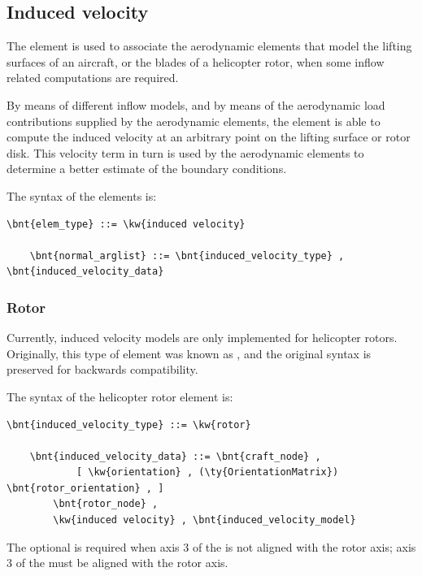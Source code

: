\subsection{Induced velocity}
\label{sec:EL:AERO:INDVEL}
The  element is used to associate the aerodynamic elements
that model the lifting surfaces of an aircraft,
or the blades of a helicopter rotor, when some inflow related computations 
are required.

By means of different inflow models, and by means
of the aerodynamic load contributions supplied by the aerodynamic elements,
the  element is able to compute the induced velocity
at an arbitrary point on the lifting surface or rotor disk.
This velocity term in turn is used by the aerodynamic elements to determine
a better estimate of the boundary conditions.

The syntax of the  elements is:
\begin{Verbatim}[commandchars=\\\{\}]
    \bnt{elem_type} ::= \kw{induced velocity}

    \bnt{normal_arglist} ::= \bnt{induced_velocity_type} , \bnt{induced_velocity_data}
\end{Verbatim}

\subsubsection{Rotor}
\label{sec:EL:AERO:INDVEL:ROTOR}
Currently, induced velocity models are only implemented
for helicopter rotors.
Originally, this type of element was known as ,
and the original syntax is preserved for backwards compatibility.

The syntax of the helicopter rotor  element is:
\begin{Verbatim}[commandchars=\\\{\}]
    \bnt{induced_velocity_type} ::= \kw{rotor}

    \bnt{induced_velocity_data} ::= \bnt{craft_node} ,
            [ \kw{orientation} , (\ty{OrientationMatrix}) \bnt{rotor_orientation} , ]
        \bnt{rotor_node} ,
        \kw{induced velocity} , \bnt{induced_velocity_model}
\end{Verbatim}
The optional  is required when axis 3 
of the  is not aligned with the rotor axis; axis 3
of the  must be aligned with the rotor axis.

